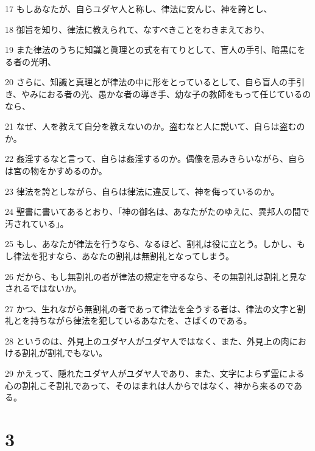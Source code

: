 \par 17 もしあなたが、自らユダヤ人と称し、律法に安んじ、神を誇とし、
\par 18 御旨を知り、律法に教えられて、なすべきことをわきまえており、
\par 19 また律法のうちに知識と眞理との式を有てりとして、盲人の手引、暗黒にをる者の光明、
\par 20 さらに、知識と真理とが律法の中に形をとっているとして、自ら盲人の手引き、やみにおる者の光、愚かな者の導き手、幼な子の教師をもって任じているのなら、
\par 21 なぜ、人を教えて自分を教えないのか。盗むなと人に説いて、自らは盗むのか。
\par 22 姦淫するなと言って、自らは姦淫するのか。偶像を忌みきらいながら、自らは宮の物をかすめるのか。
\par 23 律法を誇としながら、自らは律法に違反して、神を侮っているのか。
\par 24 聖書に書いてあるとおり、「神の御名は、あなたがたのゆえに、異邦人の間で汚されている」。
\par 25 もし、あなたが律法を行うなら、なるほど、割礼は役に立とう。しかし、もし律法を犯すなら、あなたの割礼は無割礼となってしまう。
\par 26 だから、もし無割礼の者が律法の規定を守るなら、その無割礼は割礼と見なされるではないか。
\par 27 かつ、生れながら無割礼の者であって律法を全うする者は、律法の文字と割礼とを持ちながら律法を犯しているあなたを、さばくのである。
\par 28 というのは、外見上のユダヤ人がユダヤ人ではなく、また、外見上の肉における割礼が割礼でもない。
\par 29 かえって、隠れたユダヤ人がユダヤ人であり、また、文字によらず霊による心の割礼こそ割礼であって、そのほまれは人からではなく、神から来るのである。

\chapter{3}

